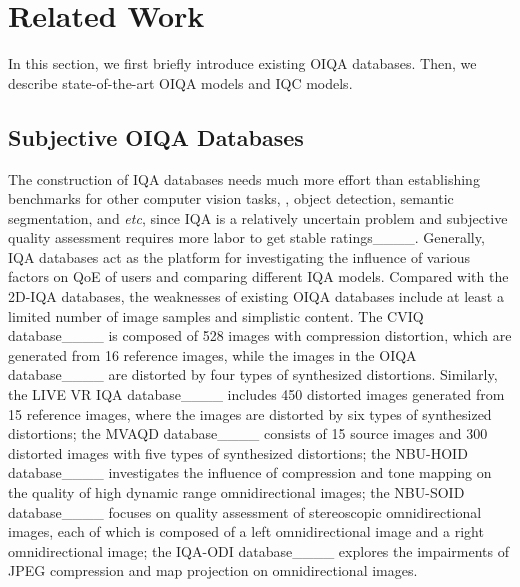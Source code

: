 \section{Related Work}
\label{sec:rw}

In this section, we first briefly introduce existing OIQA databases. Then, we describe state-of-the-art OIQA models and IQC models.


\subsection{Subjective OIQA Databases}
\label{subsec:database}

The construction of IQA databases needs much more effort than establishing benchmarks for other computer vision tasks, \eg, object detection, semantic segmentation, and \emph{etc}, since IQA is a relatively uncertain problem and subjective quality assessment requires more labor to get stable ratings____. Generally, IQA databases act as the platform for investigating the influence of various factors on QoE of users and comparing different IQA models. Compared with the 2D-IQA databases, the weaknesses of existing OIQA databases include at least a limited number of image samples and simplistic content. The CVIQ database____ is composed of 528 images with compression distortion, which are generated from 16 reference images, while the images in the OIQA database____ are distorted by four types of synthesized distortions. Similarly, the LIVE VR IQA database____ includes 450 distorted images generated from 15 reference images, where the images are distorted by six types of synthesized distortions; the MVAQD database____ consists of 15 source images and 300 distorted images with five types of synthesized distortions; the NBU-HOID database____ investigates the influence of compression and tone mapping on the quality of high dynamic range omnidirectional images; the NBU-SOID database____ focuses on quality assessment of stereoscopic omnidirectional images, each of which is composed of a left omnidirectional image and a right omnidirectional image; the IQA-ODI database____ explores the impairments of JPEG compression and map projection on omnidirectional images. 


